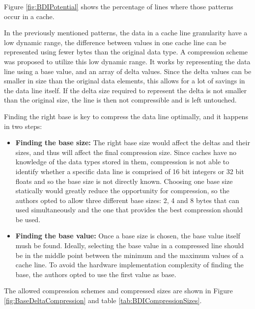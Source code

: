 Figure \ref{fig:BDIPotential} shows the percentage of lines where those patterns occur in a cache.\par
In the previously mentioned patterns, the data in a cache line granularity have a low dynamic range, the difference between values in one cache line can be represented using fewer bytes than the original data type. A compression scheme was proposed to utilize this low dynamic range. It works by representing the data line using a base value, and an array of delta values. Since the delta values can be smaller in size than the original data elements, this allows for a lot of savings in the data line itself. If the delta size required to represent the delta is not smaller than the original size, the line is then not compressible and is left untouched.\par
Finding the right base is key to compress the data line optimally, and it happens in two steps:
\begin{itemize}
    \item \textbf{Finding the base size:} The right base size would affect the deltas and their sizes, and thus will affect the final compression size. Since caches have no knowledge of the data types stored in them, compression is not able to identify whether a specific data line is comprised of 16 bit integers or 32 bit floats and so the base size is not directly known. Choosing one base size statically would greatly reduce the opportunity for compression, so the authors opted to allow three different base sizes: 2, 4 and 8 bytes that can used simultaneously and the one that provides the best compression should be used.
    \item \textbf{Finding the base value:} Once a base size is chosen, the base value itself mush be found. Ideally, selecting the base value in a compressed line should be in the middle point between the minimum and the maximum values of a cache line. To avoid the hardware implementation complexity of finding the base, the authors opted to use the first value as base.
\end{itemize}
The allowed compression schemes and compressed sizes are shown in Figure \ref{fig:BaseDeltaCompression} and table \ref{tab:BDICompressionSizes}.

